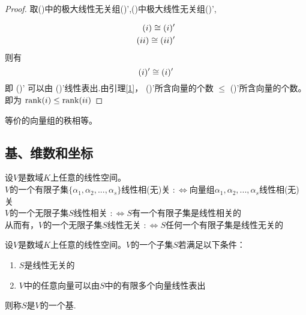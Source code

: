 \documentclass[blue,normal,cn]{elegantnote}
\begin{document}
\begin{proof}
    取(\uppercase\expandafter{})中的极大线性无关组(\uppercase\expandafter{})',(\uppercase\expandafter{})中极大线性无关组(\uppercase\expandafter{})',

    \begin{equation*}
        \begin{aligned}
            (\uppercase\expandafter{\romannumeral1})\cong (\uppercase\expandafter{\romannumeral1})'\\
            (\uppercase\expandafter{\romannumeral2}) \cong (\uppercase\expandafter{\romannumeral2})'
        \end{aligned}
    \end{equation*}
    则有
    \begin{equation*}
        (\uppercase\expandafter{\romannumeral1})'\cong (\uppercase\expandafter{\romannumeral1})'\\
    \end{equation*}
    即 (\uppercase\expandafter{})' 可以由  (\uppercase\expandafter{})'线性表出.由引理\ref{1}，  (\uppercase\expandafter{})'所含向量的个数 $\leq$ (\uppercase\expandafter{})'所含向量的个数。即为
    $\mathrm{rank}(\uppercase\expandafter{\romannumeral1}) \leq \mathrm{rank}(\uppercase\expandafter{\romannumeral2})$
\end{proof}

\begin{corollary}
    \label{4}
等价的向量组的秩相等。
\end{corollary}




 \subsection{基、维数和坐标}

\begin{definition}
    设$V$是数域$K$上任意的线性空间。\\
    $V$的一个有限子集$\{α_1,α_2,...,α_s\}$线性相(无)关
    $:\Leftrightarrow$向量组$α_1,α_2,...,α_s$线性相(无)关\\
    $V$的一个无限子集$S$线性相关
    $:\Leftrightarrow S$有一个有限子集是线性相关的\\
    从而有，$V$的一个无限子集$S$线性无关 $:\Leftrightarrow S$任何一个有限子集是线性无关的
\end{definition}

\begin{definition}
    设$V$是数域$K$上任意的线性空间。$V$的一个子集$S$若满足以下条件：
    \begin{enumerate}
        \item $S$是线性无关的
        \item $V$中的任意向量可以由$S$中的有限多个向量线性表出
    \end{enumerate}
    则称$S$是$V$的一个基.
\end{definition}
\end{document}
